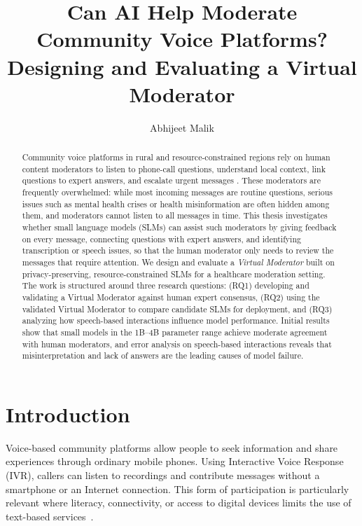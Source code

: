 \documentclass[11pt,a4paper]{article}
\title{\textbf{Can AI Help Moderate Community Voice Platforms?\\
Designing and Evaluating a Virtual Moderator}}
\author[]{Abhijeet Malik}
\affil[]{Supervised by Dr. Vikram Kamath Cannanure}
\date{}
\begin{document}
\maketitle

\begin{abstract}
\noindent Community voice platforms in rural and resource-constrained regions rely on human content moderators to listen to phone-call questions, understand local context, link questions to expert answers, and escalate urgent messages \cite{khullar2021moderation}. These moderators are frequently overwhelmed: while most incoming messages are routine questions, serious issues such as mental health crises or health misinformation are often hidden among them, and moderators cannot listen to all messages in time. This thesis investigates whether small language models (SLMs) can assist such moderators by giving feedback on every message, connecting questions with expert answers, and identifying transcription or speech issues, so that the human moderator only needs to review the messages that require attention. We design and evaluate a \emph{Virtual Moderator} built on privacy-preserving, resource-constrained SLMs for a healthcare moderation setting. The work is structured around three research questions: (RQ1) developing and validating a Virtual Moderator against human expert consensus, (RQ2) using the validated Virtual Moderator to compare candidate SLMs for deployment, and (RQ3) analyzing how speech-based interactions influence model performance. Initial results show that small models in the 1B--4B parameter range achieve moderate agreement with human moderators, and error analysis on speech-based interactions reveals that misinterpretation and lack of answers are the leading causes of model failure.
\end{abstract}


\section{Introduction}
\label{sec:introduction}

Voice-based community platforms allow people to seek information and share
experiences through ordinary mobile phones. Using Interactive Voice Response
(IVR), callers can listen to recordings and contribute messages without a
smartphone or an Internet connection. This form of participation is
particularly relevant where literacy, connectivity, or access to digital
devices limits the use of text-based services~\cite{khullar2021moderation}.
\end{document}
